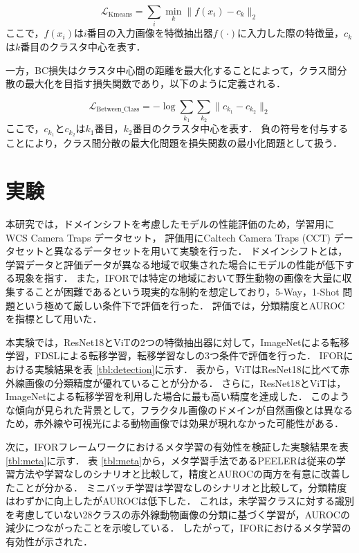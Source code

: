 \documentclass[uplatex,dvipdfmx,10pt,twocolumn]{jsarticle}
\begin{document}
\begin{equation}
  \mathcal{L}_{\mathrm{Kmeans}} = \sum_i{\min_k \lVert f(x_i)-c_k \rVert_2}
\end{equation}
ここで，$f(x_i)$は$i$番目の入力画像を特徴抽出器$f(\cdot)$に入力した際の特徴量，$c_k$は$k$番目のクラスタ中心を表す．

一方，BC損失はクラスタ中心間の距離を最大化することによって，クラス間分散の最大化を目指す損失関数であり，以下のように定義される．

\begin{equation}
  \mathcal{L}_{\mathrm{Between\_Class}} = -\log{\sum_{k_1}{\sum_{k_2}{\lVert c_{k_1} - c_{k_2} \rVert_2}}}
\end{equation}
ここで，$c_{k_1}$と$c_{k_2}$は$k_1$番目，$k_2$番目のクラスタ中心を表す．
負の符号を付与することにより，クラス間分散の最大化問題を損失関数の最小化問題として扱う．

\section{実験}

本研究では，ドメインシフトを考慮したモデルの性能評価のため，学習用にWCS Camera Traps データセット，
評価用にCaltech Camera Traps (CCT) データセットと異なるデータセットを用いて実験を行った．
ドメインシフトとは，学習データと評価データが異なる地域で収集された場合にモデルの性能が低下する現象を指す．
また，IFORでは特定の地域において野生動物の画像を大量に収集することが困難であるという現実的な制約を想定しており，5-Way，1-Shot 問題という極めて厳しい条件下で評価を行った．
評価では，分類精度とAUROCを指標として用いた．

本実験では，ResNet18とViTの2つの特徴抽出器に対して，ImageNetによる転移学習，FDSLによる転移学習，転移学習なしの3つ条件で評価を行った．
IFORにおける実験結果を表 \ref{tbl:detection}に示す．
表から，ViTはResNet18に比べて赤外線画像の分類精度が優れていることが分かる．
さらに，ResNet18とViTは，ImageNetによる転移学習を利用した場合に最も高い精度を達成した．
このような傾向が見られた背景として，フラクタル画像のドメインが自然画像とは異なるため，赤外線や可視光による動物画像では効果が現れなかった可能性がある．

次に，IFORフレームワークにおけるメタ学習の有効性を検証した実験結果を表 \ref{tbl:meta}に示す．
表 \ref{tbl:meta}から，メタ学習手法であるPEELERは従来の学習方法や学習なしのシナリオと比較して，精度とAUROCの両方を有意に改善したことが分かる．
ミニバッチ学習は学習なしのシナリオと比較して，分類精度はわずかに向上したがAUROCは低下した．
これは，未学習クラスに対する識別を考慮していない28クラスの赤外線動物画像の分類に基づく学習が，AUROCの減少につながったことを示唆している．
したがって，IFORにおけるメタ学習の有効性が示された．
\end{document}
